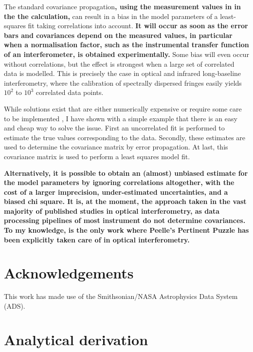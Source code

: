 \documentclass{pasa}
\def\correction#1{{\bfseries #1}}
\begin{document}
The standard covariance propagation\correction{, using the measurement values in in the the calculation,} can result in a bias in the model parameters of a least-squares fit taking correlations into account. \correction{It will occur as soon as the error bars and covariances depend on the measured values, in particular when a normalisation factor, such as the instrumental transfer function of an interferometer, is obtained experimentally.}  Some bias will even occur without correlations, but the effect is strongest when a large set of correlated data is modelled.  This is precisely the case in optical and infrared long-baseline interferometry, where the calibration of spectrally dispersed fringes easily yields $10^2$ to $10^3$ correlated data points.



While solutions exist that are either numerically expensive or require some care to be implemented \citep{BUR11,BEC12,NIS14}, I have shown with a simple example that there is an easy and cheap way to solve the issue. First an uncorrelated fit is performed to estimate the true values corresponding to the data.  Secondly, these estimates are used to determine the covariance matrix by error propagation. At last, this covariance matrix is used to perform a least squares model fit.

\correction{Alternatively, it is possible to obtain an (almost) unbiased estimate for the model parameters by ignoring correlations altogether, with the cost of a larger imprecision, under-estimated uncertainties, and a biased chi square. It is, at the moment, the approach taken in the vast majority of published studies in optical interferometry, as data processing pipelines of most instrument do not determine covariances. To my knowledge, \citet{LAC19} is the only work where Peelle's Pertinent Puzzle has been explicitly taken care of in optical interferometry.}

\section*{Acknowledgements}
This work has made use of the Smithsonian/NASA Astrophysics Data System (ADS).

\appendix

\section{Analytical derivation}
\end{document}
